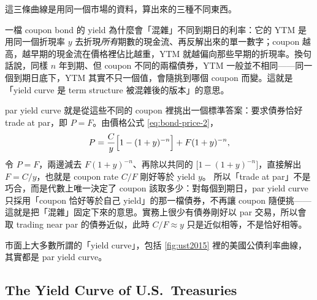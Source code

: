 \suppstart
\begin{note}
	這三條曲線是用同一個市場的資料，算出來的三種不同東西。

	一檔 coupon bond 的 yield 為什麼會「混雜」不同到期日的利率：它的 YTM 是用同一個折現率 $y$ 去折現\emph{所有}期數的現金流、再反解出來的單一數字；coupon 越高，越早期的現金流在價格裡佔比越重，YTM 就越偏向那些早期的折現率。換句話說，同樣 $n$ 年到期、但 coupon 不同的兩檔債券，YTM 一般並不相同——同一個到期日底下，YTM 其實不只一個值，會隨挑到哪個 coupon 而變。這就是「yield curve 是 term structure 被混雜後的版本」的意思。

	par yield curve 就是從這些不同的 coupon 裡挑出一個標準答案：要求債券恰好 trade at par，即 $P=F$。由價格公式 \eqref{eq:bond-price-2}，
	\[
		P=\frac{C}{y}\Bigl[1-(1+y)^{-n}\Bigr]+F(1+y)^{-n} ,
	\]
	令 $P=F$，兩邊減去 $F(1+y)^{-n}$、再除以共同的 $\bigl[1-(1+y)^{-n}\bigr]$，直接解出 $F=C/y$，也就是 coupon rate $C/F$ 剛好等於 yield $y$。
	所以「trade at par」不是巧合，而是代數上唯一決定了 coupon 該取多少：對每個到期日，par yield curve 只採用「coupon 恰好等於自己 yield」的那一檔債券，不再讓 coupon 隨便挑——這就是把「混雜」固定下來的意思。實務上很少有債券剛好以 par 交易，所以會取 trading near par 的債券近似，此時 $C/F\approx y$ 只是近似相等，不是恰好相等。

	市面上大多數所謂的「yield curve」，包括 \autoref{fig:ust2015} 裡的美國公債利率曲線，其實都是 par yield curve。
\end{note}
\suppend

\subsection{The Yield Curve of U.S.\ Treasuries}


